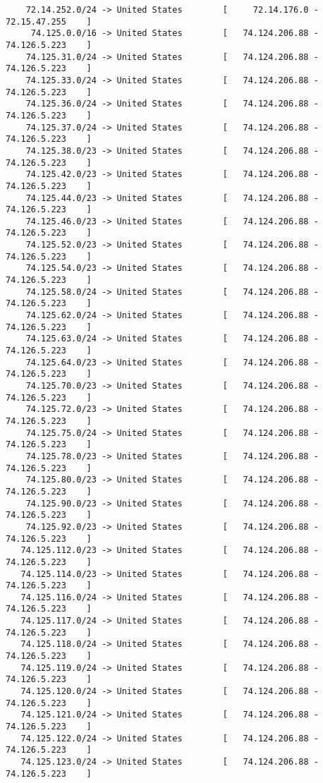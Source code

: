 \documentclass[10pt,a4paper,twoside,onecolumn]{article}
\begin{document}
\begin{lstlisting}
    72.14.252.0/24 -> United States        [     72.14.176.0 - 72.15.47.255    ]
     74.125.0.0/16 -> United States        [   74.124.206.88 - 74.126.5.223    ]
    74.125.31.0/24 -> United States        [   74.124.206.88 - 74.126.5.223    ]
    74.125.33.0/24 -> United States        [   74.124.206.88 - 74.126.5.223    ]
    74.125.36.0/24 -> United States        [   74.124.206.88 - 74.126.5.223    ]
    74.125.37.0/24 -> United States        [   74.124.206.88 - 74.126.5.223    ]
    74.125.38.0/23 -> United States        [   74.124.206.88 - 74.126.5.223    ]
    74.125.42.0/23 -> United States        [   74.124.206.88 - 74.126.5.223    ]
    74.125.44.0/23 -> United States        [   74.124.206.88 - 74.126.5.223    ]
    74.125.46.0/23 -> United States        [   74.124.206.88 - 74.126.5.223    ]
    74.125.52.0/23 -> United States        [   74.124.206.88 - 74.126.5.223    ]
    74.125.54.0/23 -> United States        [   74.124.206.88 - 74.126.5.223    ]
    74.125.58.0/24 -> United States        [   74.124.206.88 - 74.126.5.223    ]
    74.125.62.0/24 -> United States        [   74.124.206.88 - 74.126.5.223    ]
    74.125.63.0/24 -> United States        [   74.124.206.88 - 74.126.5.223    ]
    74.125.64.0/23 -> United States        [   74.124.206.88 - 74.126.5.223    ]
    74.125.70.0/23 -> United States        [   74.124.206.88 - 74.126.5.223    ]
    74.125.72.0/23 -> United States        [   74.124.206.88 - 74.126.5.223    ]
    74.125.75.0/24 -> United States        [   74.124.206.88 - 74.126.5.223    ]
    74.125.78.0/23 -> United States        [   74.124.206.88 - 74.126.5.223    ]
    74.125.80.0/23 -> United States        [   74.124.206.88 - 74.126.5.223    ]
    74.125.90.0/23 -> United States        [   74.124.206.88 - 74.126.5.223    ]
    74.125.92.0/23 -> United States        [   74.124.206.88 - 74.126.5.223    ]
   74.125.112.0/23 -> United States        [   74.124.206.88 - 74.126.5.223    ]
   74.125.114.0/23 -> United States        [   74.124.206.88 - 74.126.5.223    ]
   74.125.116.0/24 -> United States        [   74.124.206.88 - 74.126.5.223    ]
   74.125.117.0/24 -> United States        [   74.124.206.88 - 74.126.5.223    ]
   74.125.118.0/24 -> United States        [   74.124.206.88 - 74.126.5.223    ]
   74.125.119.0/24 -> United States        [   74.124.206.88 - 74.126.5.223    ]
   74.125.120.0/24 -> United States        [   74.124.206.88 - 74.126.5.223    ]
   74.125.121.0/24 -> United States        [   74.124.206.88 - 74.126.5.223    ]
   74.125.122.0/24 -> United States        [   74.124.206.88 - 74.126.5.223    ]
   74.125.123.0/24 -> United States        [   74.124.206.88 - 74.126.5.223    ]

\end{lstlisting}
\end{document}
